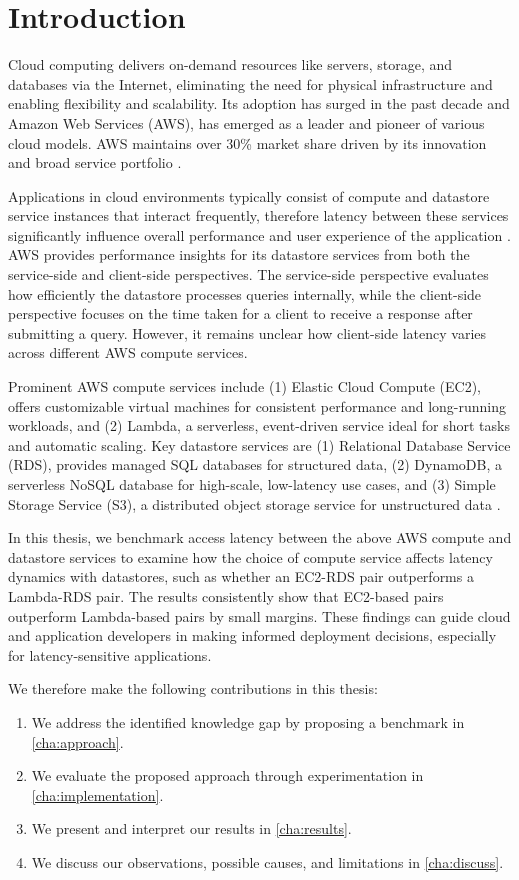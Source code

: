\section{Introduction}
\label{cha:intro}

Cloud computing delivers on-demand resources like servers, storage, and databases via the Internet, eliminating the need for physical infrastructure and enabling flexibility and scalability. Its adoption has surged in the past decade and Amazon Web Services (AWS), has emerged as a leader and pioneer of various cloud models. AWS maintains over 30\% market share driven by its innovation and broad service portfolio \cite{}.

Applications in cloud environments typically consist of compute and datastore service instances that interact frequently, therefore latency between these services significantly influence overall performance and user experience of the application \cite{}. AWS provides performance insights for its datastore services from both the service-side and client-side perspectives. The service-side perspective evaluates how efficiently the datastore processes queries internally, while the client-side perspective focuses on the time taken for a client to receive a response after submitting a query. However, it remains unclear how client-side latency varies across different AWS compute services.

Prominent AWS compute services include (1) Elastic Cloud Compute (EC2), offers customizable virtual machines for consistent performance and long-running workloads, and (2) Lambda, a serverless, event-driven service ideal for short tasks and automatic scaling. Key datastore services are (1) Relational Database Service (RDS), provides managed SQL databases for structured data, (2) DynamoDB, a serverless NoSQL database for high-scale, low-latency use cases, and (3) Simple Storage Service (S3), a distributed object storage service for unstructured data \cite{}.

In this thesis, we benchmark access latency between the above AWS compute and datastore services to examine how the choice of compute service affects latency dynamics with datastores, such as whether an EC2-RDS pair outperforms a Lambda-RDS pair. The results consistently show that EC2-based pairs outperform Lambda-based pairs by small margins. These findings can guide cloud and application developers in making informed deployment decisions, especially for latency-sensitive applications.


We therefore make the following contributions in this thesis:
\begin{enumerate}
	\item We address the identified knowledge gap by proposing a benchmark in \cref{cha:approach}.
	\item We evaluate the proposed approach through experimentation in \cref{cha:implementation}.
	\item We present and interpret our results in \cref{cha:results}.
	\item We discuss our observations, possible causes, and limitations in \cref{cha:discuss}.
\end{enumerate}
